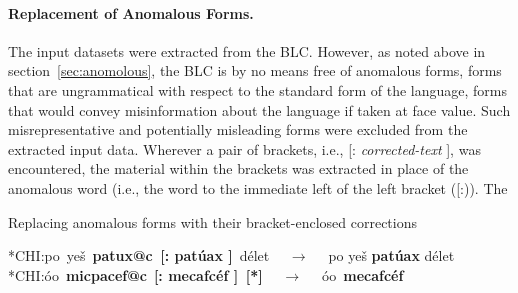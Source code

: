 \paragraph{Replacement of Anomalous Forms.} 
The input datasets were extracted from the \ac{BLC}. However, as noted above in 
section~\ref{sec:anomolous}, the \ac{BLC} is by no means free of anomalous forms, 
forms that are ungrammatical with respect to the standard form of the language, 
forms that would convey misinformation about the language if taken at face value. 
Such misrepresentative and potentially misleading forms were excluded from the 
extracted input data.  
Wherever a pair of brackets, i.e., \textsf{[: \textit{corrected-text} ]}, was encountered, 
the material within the brackets was extracted in place of the anomalous word (i.e., the 
word to the immediate left of the left bracket (\textsf{[:})). The 


\begin{exe}\label{ex:replace}
	\ex Replacing anomalous forms with their bracket-enclosed corrections
	\begin{xlist}
	   \ex \textsf{*\ac{CH}I:}\quad\textsf{po\, ye\v{s}\, \textbf{patux@c\, [: pat\'{u}ax ]}\, d\'{e}let} $\quad\to\quad$
	   \textsf{po ye\v{s} \textbf{pat\'{u}ax} d\'{e}let}
	   \ex \textsf{*\ac{CH}I:}\quad\textsf{\textglotstop\'{o}o\, \textbf{micpacef@c}\, \textbf{[: mecafc\'ef ]\, [*]}} $\quad\to\quad$ \textsf{\textglotstop\'oo\, \textbf{mecafc\'ef}}
	\end{xlist}
\end{exe} 

